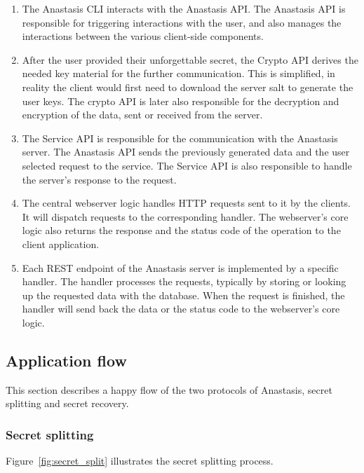 \begin{enumerate}
\item The Anastasis CLI interacts with the Anastasis API. The
  Anastasis API is responsible for triggering interactions with the
  user, and also manages the interactions between the
  various client-side components.
\item After the user provided their unforgettable secret, the
  Crypto API derives the needed key material for the further
  communication. This is simplified, in reality the client would first
  need to download the server salt to generate the user keys.  The
  crypto API is later also responsible for the decryption and
  encryption of the data, sent or received from the server.
\item The Service API is responsible for the communication with the
  Anastasis server. The Anastasis API sends the previously generated
  data and the user selected request to the service.
  The Service API is also responsible to handle
  the server's response to the request.
\item The central webserver logic handles HTTP requests sent to it by the
  clients. It will dispatch requests to the corresponding handler. The
  webserver's core logic also returns the response and the status code
  of the operation to the client application.
\item Each REST endpoint of the Anastasis server is implemented by
  a specific handler. The handler processes the requests, typically
  by storing or looking up the requested
  data with the database. When the request is finished, the handler will
  send back the data or the status code to the webserver's core logic.
\end{enumerate}






\newpage
\subsection{Application flow}

This section describes a happy flow of the two protocols of Anastasis,
secret splitting and secret recovery.

\subsubsection{Secret splitting}

Figure~\ref{fig:secret_split} illustrates the secret splitting
process.

